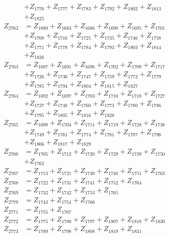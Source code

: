 \begin{multicols}{2}
\begin{align}
&+ Z_{1770} + Z_{1777} + Z_{1783} + Z_{1792} + Z_{1802} + Z_{1813}  \nonumber \\
&+ Z_{1825} \nonumber \\
Z_{2762} &= Z_{1680} + Z_{1683} + Z_{1686} + Z_{1690} + Z_{1695} + Z_{1701}  \nonumber \\
&+ Z_{1708} + Z_{1716} + Z_{1725} + Z_{1735} + Z_{1746} + Z_{1758}  \nonumber \\
&+ Z_{1771} + Z_{1778} + Z_{1784} + Z_{1793} + Z_{1803} + Z_{1814}  \nonumber \\
&+ Z_{1826} \nonumber \\
Z_{2763} &= Z_{1687} + Z_{1691} + Z_{1696} + Z_{1702} + Z_{1709} + Z_{1717}  \nonumber \\
&+ Z_{1726} + Z_{1736} + Z_{1747} + Z_{1759} + Z_{1772} + Z_{1779}  \nonumber \\
&+ Z_{1785} + Z_{1794} + Z_{1804} + Z_{1815} + Z_{1827} \nonumber \\
Z_{2764} &= Z_{1692} + Z_{1697} + Z_{1703} + Z_{1710} + Z_{1718} + Z_{1727}  \nonumber \\
&+ Z_{1737} + Z_{1748} + Z_{1760} + Z_{1773} + Z_{1780} + Z_{1786}  \nonumber \\
&+ Z_{1795} + Z_{1805} + Z_{1816} + Z_{1828} \nonumber \\
Z_{2765} &= Z_{1698} + Z_{1704} + Z_{1711} + Z_{1719} + Z_{1728} + Z_{1738}  \nonumber \\
&+ Z_{1749} + Z_{1761} + Z_{1774} + Z_{1781} + Z_{1787} + Z_{1796}  \nonumber \\
&+ Z_{1806} + Z_{1817} + Z_{1829} \nonumber \\
Z_{2766} &= Z_{1705} + Z_{1712} + Z_{1720} + Z_{1729} + Z_{1739} + Z_{1750}  \nonumber \\
&+ Z_{1762} \nonumber \\
Z_{2767} &= Z_{1713} + Z_{1721} + Z_{1730} + Z_{1740} + Z_{1751} + Z_{1763} \nonumber \\
Z_{2768} &= Z_{1722} + Z_{1731} + Z_{1741} + Z_{1752} + Z_{1764} \nonumber \\
Z_{2769} &= Z_{1732} + Z_{1742} + Z_{1753} + Z_{1765} \nonumber \\
Z_{2770} &= Z_{1743} + Z_{1754} + Z_{1766} \nonumber \\
Z_{2771} &= Z_{1755} + Z_{1767} \nonumber \\
Z_{2772} &= Z_{1775} + Z_{1788} + Z_{1797} + Z_{1807} + Z_{1818} + Z_{1830} \nonumber \\
Z_{2773} &= Z_{1789} + Z_{1798} + Z_{1808} + Z_{1819} + Z_{1831} \nonumber \\

\end{align}
\end{multicols}
